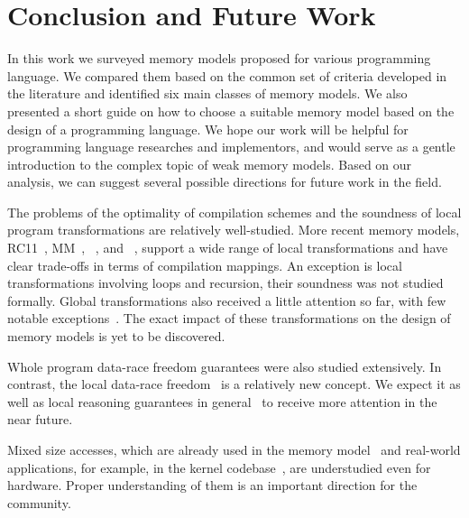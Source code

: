 \section{Conclusion and Future Work}
\label{sec:conclusion}

In this work we surveyed memory models 
proposed for various programming language. 
We compared them based on the common set of criteria
developed in the literature and identified 
six main classes of memory models.
We also presented a short guide on how to 
choose a suitable memory model based on 
the design of a programming language. 
We hope our work will be helpful for 
programming language researches and implementors,
and would serve as a gentle introduction 
to the complex topic of weak memory models. 
Based on our analysis, we can suggest several
possible directions for future work in the field. 

The problems of the optimality of compilation schemes
and the soundness of local program transformations are relatively well-studied.
More recent memory models,
RC11~\cite{Lahav-al:PLDI17},
\OCaml MM~\cite{Dolan-al:PLDI18},
\Promising~\cite{Kang-al:POPL17,Lee-al:PLDI20},
and \Weakestmo~\cite{Chakraborty-Vafeiadis:POPL19},
support a wide range of local transformations and have clear 
trade-offs in terms of compilation mappings. 
An exception is local transformations involving loops and recursion, 
their soundness was not studied formally. 
Global transformations also received a little attention so far,
with few notable exceptions~\cite{PichonPharabod-Sewell:POPL16, Lee-al:PLDI20}.
The exact impact of these transformations on the design of 
memory models is yet to be discovered. 

Whole program data-race freedom guarantees were also studied extensively.
In contrast, the local data-race freedom~\cite{Dolan-al:PLDI18} 
is a relatively new concept. 
We expect it as well as local reasoning guarantees 
in general~\cite{Dodds-al:ESOP18, Jagadeesan-al:OOPSLA2020, Cho-al:PLDI21} 
to receive more attention in the near future.  

Mixed size accesses\cite{Flur-al:POPL17},
which are already used in the \JS memory model~\cite{Watt-al:PLDI2020}
and real-world applications, for example, in the \Linux kernel codebase~\cite{Flur-al:POPL17},
are understudied even for hardware.
Proper understanding of them is an important direction for the community. 

